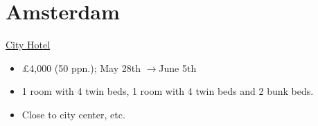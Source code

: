\documentclass[12pt]{article}
\renewcommand{\to}{$\rightarrow$}
\newcommand{\cost}[2]{\pounds#1 (#2 ppn.)}
\begin{document}
	\section{Amsterdam}
	\href{https://www.booking.com/hotel/nl/cityhotelamsterdam.html?sid=3f62ec944d118827daff72c411262409&aid=355028&ucfs=1&arphpl=1&checkin=2022-05-28&checkout=2022-06-05&dest_id=145&dest_type=district&group_adults=10&req_adults=10&no_rooms=1&group_children=0&req_children=0&hpos=2&hapos=2&sr_order=popularity&srpvid=5a3f77194b1f019a&srepoch=1648313785&all_sr_blocks=1049823_95128969_0_2_0%2C1049807_95128969_0_2_0&highlighted_blocks=1049823_95128969_0_2_0%2C1049807_95128969_0_2_0&matching_block_id=1049823_95128969_0_2_0&sr_pri_blocks=1049823_95128969_0_2_0__271755%2C1049807_95128969_0_2_0__203115&from=searchresults#hotelTmpl}{City Hotel}
	\begin{itemize}
		\item \cost{4,000}{50}; May 28th \to June 5th 
		\item 1 room with 4 twin beds, 1 room with 4 twin beds and 2 bunk beds.
		\item Close to city center, etc.
	\end{itemize}
	
\end{document}
